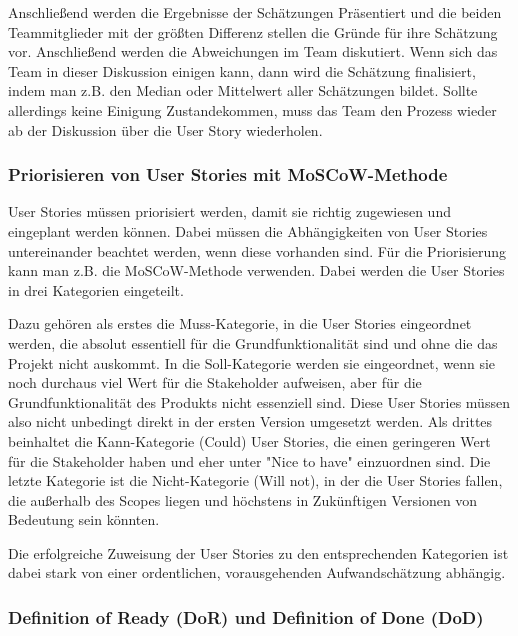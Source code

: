 \documentclass[acmtog]{acmart}
\begin{document}
Anschließend werden die Ergebnisse der Schätzungen Präsentiert und die beiden Teammitglieder mit der größten Differenz stellen die Gründe für ihre Schätzung vor. 
Anschließend werden die Abweichungen im Team diskutiert. Wenn sich das Team in dieser Diskussion einigen kann, dann wird die Schätzung finalisiert, indem man z.B. 
den Median oder Mittelwert aller Schätzungen bildet. Sollte allerdings keine Einigung Zustandekommen, muss das Team den Prozess wieder ab der Diskussion über die 
User Story wiederholen. \cite{planingpoker}

\subsubsection{Priorisieren von User Stories mit MoSCoW-Methode} \label{sec:priorization}

User Stories müssen priorisiert werden, damit sie richtig zugewiesen und eingeplant werden können. Dabei müssen die Abhängigkeiten von User Stories untereinander 
beachtet werden, wenn diese vorhanden sind. Für die Priorisierung kann man z.B. die MoSCoW-Methode verwenden. Dabei werden die User Stories in drei Kategorien eingeteilt. \cite{moscow}

Dazu gehören als erstes die Muss-Kategorie, in die User Stories eingeordnet werden, die absolut essentiell für die Grundfunktionalität sind und ohne die das 
Projekt nicht auskommt. In die Soll-Kategorie werden sie eingeordnet, wenn sie noch durchaus viel Wert für die Stakeholder aufweisen, aber für die Grundfunktionalität 
des Produkts nicht essenziell sind. Diese User Stories müssen also nicht unbedingt direkt in der ersten Version umgesetzt werden. Als drittes beinhaltet die Kann-Kategorie 
(Could) User Stories, die einen geringeren Wert für die Stakeholder haben und eher unter "Nice to have" einzuordnen sind. Die letzte Kategorie ist die Nicht-Kategorie 
(Will not), in der die User Stories fallen, die außerhalb des Scopes liegen und höchstens in Zukünftigen Versionen von Bedeutung sein könnten. \cite{moscow}

Die erfolgreiche Zuweisung der User Stories zu den entsprechenden Kategorien ist dabei stark von einer ordentlichen, vorausgehenden Aufwandschätzung abhängig. \cite{moscow}


\subsubsection{Definition of Ready (DoR) und Definition of Done (DoD)}
\end{document}
